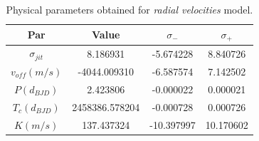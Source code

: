 \documentclass[a4paper,11pt,twocolumn]{article}
\begin{document}
\begin{table}[h!]
    \centering
       \begin{tabular}{cccc}
       \hline
        Par& Value & $\sigma_{-}$ & $\sigma_{+}$\\
       \hline
		$\sigma_{jit}$ &      8.186931  &     -5.674228  &    8.840726 \\
		$v_{off} (m/s)$ &         -4044.009310 &        -6.587574 &        7.142502 \\
	    $P (d_{BJD})$   &2.423806        & -0.000022   &      0.000021   \\
	    $T_c (d_{BJD})$  &2458386.578204  & -0.000728   &      0.000726  \\
	    $K (m/s)$   &137.437324      & -10.397997  &      10.170602\\
       \hline
       \end{tabular} 
     \caption{Physical parameters obtained for \textit{radial velocities} model.}
\end{table}
\end{document}
